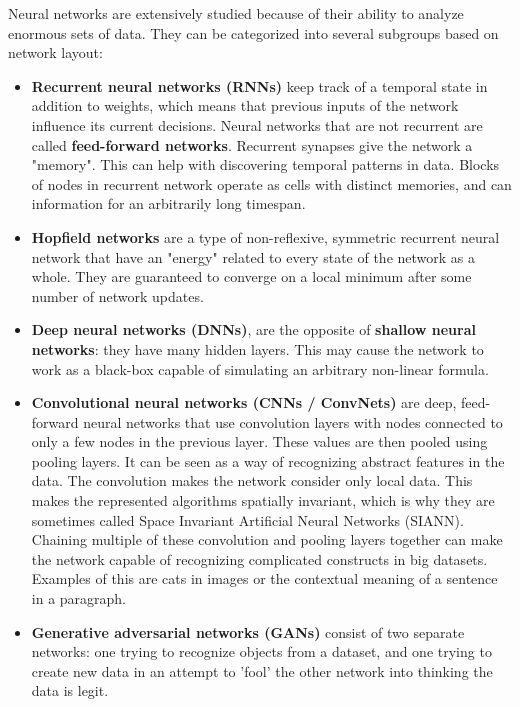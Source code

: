 \begin{itemize}
		Neural networks are extensively studied because of their ability to analyze enormous sets of data. They can be categorized into several subgroups based on network layout:
		\begin{itemize}
			\item \textbf{Recurrent neural networks (RNNs)}
				keep track of a temporal state in addition to weights, which means that previous inputs of the network influence its current decisions. Neural networks that are not recurrent are called \textbf{feed-forward networks}. Recurrent synapses give the network a "memory". This can help with discovering temporal patterns in data. Blocks of nodes in recurrent network operate as cells with distinct memories, and can information for an arbitrarily long timespan.
			\item \textbf{Hopfield networks}
				are a type of non-reflexive, symmetric recurrent neural network that have an "energy" related to every state of the network as a whole. They are guaranteed to converge on a local minimum after some number of network updates.
			\item \textbf{Deep neural networks (DNNs)},
				are the opposite of \textbf{shallow neural networks}: they have many hidden layers. This may cause the network to work as a black-box
				capable of simulating an arbitrary non-linear formula.
			\item \textbf{Convolutional neural networks (CNNs / ConvNets)}
				are deep, feed-forward neural networks that use convolution layers with nodes connected to only a few nodes in the previous layer. These values are then pooled using pooling layers. It can be seen as a way of recognizing abstract features in the data. The convolution makes the network consider only local data. This makes the represented algorithms spatially invariant, which is why they are sometimes called Space Invariant Artificial Neural Networks (SIANN). Chaining multiple of these convolution and pooling layers together can make the network capable of recognizing complicated constructs in big datasets. Examples of this are cats in images or the contextual meaning of a sentence in a paragraph.
			\item \textbf{Generative adversarial networks (GANs)}
				consist of two separate networks: one trying to recognize objects from a dataset, and one trying to create new data in an attempt to 'fool' the other network into thinking the data is legit.\cite{Li:2013:CAL:2463372.2465801}

\end{itemize}
\end{itemize}
